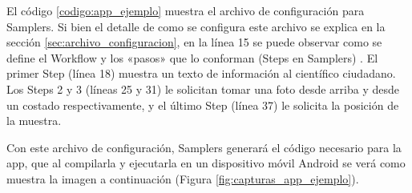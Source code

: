 El código \ref{codigo:app_ejemplo} muestra el archivo de configuración para Samplers. Si bien el detalle de como se configura este archivo se explica en la sección \ref{sec:archivo_configuracion}, en la línea 15 se puede observar como se define el Workflow y los «pasos» que lo conforman (Steps en Samplers) . El primer Step (línea 18) muestra un texto de información al científico ciudadano. Los Steps 2 y 3 (líneas 25 y 31) le solicitan tomar una foto desde arriba y desde un costado respectivamente, y el último Step (línea 37) le solicita la posición de la muestra.


Con este archivo de configuración, Samplers generará el código necesario para la app, que al compilarla y ejecutarla en un dispositivo móvil Android se verá como muestra la imagen a continuación (Figura \ref{fig:capturas_app_ejemplo}).



